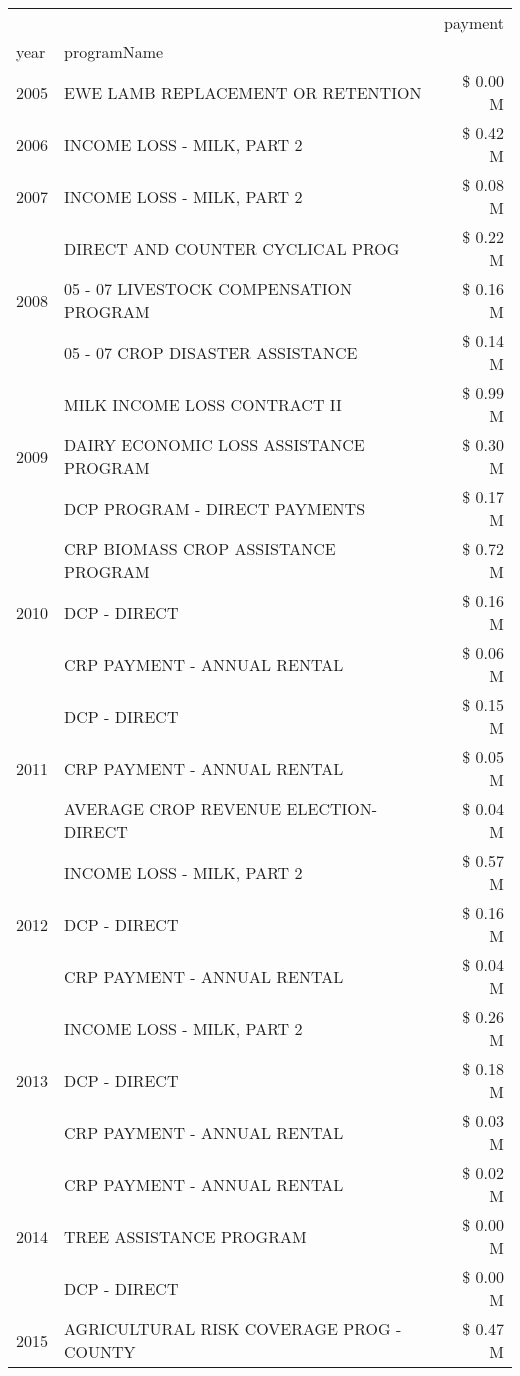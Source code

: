 \begin{tabular}{llr}
\toprule
 &  & payment \\
year & programName &  \\
\midrule
2005 & EWE LAMB REPLACEMENT OR RETENTION & \$ 0.00 M \\
\cline{1-3}
2006 & INCOME LOSS - MILK, PART 2 & \$ 0.42 M \\
\cline{1-3}
2007 & INCOME LOSS - MILK, PART 2 & \$ 0.08 M \\
\cline{1-3}
\multirow[t]{3}{*}{2008} & DIRECT AND COUNTER CYCLICAL PROG & \$ 0.22 M \\
 & 05 - 07 LIVESTOCK COMPENSATION PROGRAM & \$ 0.16 M \\
 & 05 - 07 CROP DISASTER ASSISTANCE & \$ 0.14 M \\
\cline{1-3}
\multirow[t]{3}{*}{2009} & MILK INCOME LOSS CONTRACT II & \$ 0.99 M \\
 & DAIRY ECONOMIC LOSS ASSISTANCE PROGRAM & \$ 0.30 M \\
 & DCP PROGRAM - DIRECT PAYMENTS & \$ 0.17 M \\
\cline{1-3}
\multirow[t]{3}{*}{2010} & CRP BIOMASS CROP ASSISTANCE PROGRAM & \$ 0.72 M \\
 & DCP - DIRECT & \$ 0.16 M \\
 & CRP PAYMENT - ANNUAL RENTAL & \$ 0.06 M \\
\cline{1-3}
\multirow[t]{3}{*}{2011} & DCP - DIRECT & \$ 0.15 M \\
 & CRP PAYMENT - ANNUAL RENTAL & \$ 0.05 M \\
 & AVERAGE CROP REVENUE ELECTION-DIRECT & \$ 0.04 M \\
\cline{1-3}
\multirow[t]{3}{*}{2012} & INCOME LOSS - MILK, PART 2 & \$ 0.57 M \\
 & DCP - DIRECT & \$ 0.16 M \\
 & CRP PAYMENT - ANNUAL RENTAL & \$ 0.04 M \\
\cline{1-3}
\multirow[t]{3}{*}{2013} & INCOME LOSS - MILK, PART 2 & \$ 0.26 M \\
 & DCP - DIRECT & \$ 0.18 M \\
 & CRP PAYMENT - ANNUAL RENTAL & \$ 0.03 M \\
\cline{1-3}
\multirow[t]{3}{*}{2014} & CRP PAYMENT - ANNUAL RENTAL & \$ 0.02 M \\
 & TREE ASSISTANCE PROGRAM & \$ 0.00 M \\
 & DCP - DIRECT & \$ 0.00 M \\
\cline{1-3}
\multirow[t]{3}{*}{2015} & AGRICULTURAL RISK COVERAGE PROG - COUNTY & \$ 0.47 M \\

\end{tabular}
